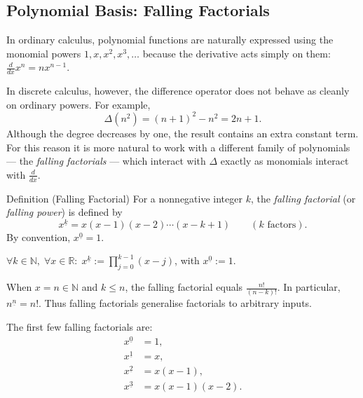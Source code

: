 
\subsection{Polynomial Basis: Falling Factorials}
\label{sec:falling-factorials}

In ordinary calculus, polynomial functions are naturally expressed using
the monomial powers \(1, x, x^2, x^3, \dots\) because the derivative
acts simply on them: \(\tfrac{d}{dx} x^n = n x^{n-1}\).

In discrete calculus, however, the difference operator does not behave
as cleanly on ordinary powers. For example,
\[
\Delta(n^2) = (n+1)^2 - n^2 = 2n + 1.
\]
Although the degree decreases by one, the result contains an extra
constant term. For this reason it is more natural to work with a
different family of polynomials --- the \emph{falling factorials} ---
which interact with \(\Delta\) exactly as monomials interact with
\(\tfrac{d}{dx}\).

\begin{definitionbox}{Definition (Falling Factorial)}
For a nonnegative integer \(k\), the \emph{falling factorial} (or
\emph{falling power}) is defined by
\[
x^{\underline{k}} = x(x-1)(x-2)\cdots(x-k+1)
\qquad (k \text{ factors}).
\]
By convention, \(x^{\underline{0}} = 1\).
\end{definitionbox}
\label{def:falling-factorial}

\begin{remark*}
\(\forall k \in \mathbb{N},\; \forall x \in \mathbb{R}:\;
x^{\underline{k}} := \displaystyle\prod_{j=0}^{k-1}(x-j)\),
with \(x^{\underline{0}} := 1\).
\end{remark*}

\begin{remark*}
When \(x = n \in \mathbb{N}\) and \(k \le n\), the falling factorial
equals \(\tfrac{n!}{(n-k)!}\). In particular, \(n^{\underline{n}} = n!\).
Thus falling factorials generalise factorials to arbitrary inputs.
\end{remark*}

The first few falling factorials are:
\[
\begin{aligned}
x^{\underline{0}} &= 1, \\
x^{\underline{1}} &= x, \\
x^{\underline{2}} &= x(x-1), \\
x^{\underline{3}} &= x(x-1)(x-2).
\end{aligned}
\]

